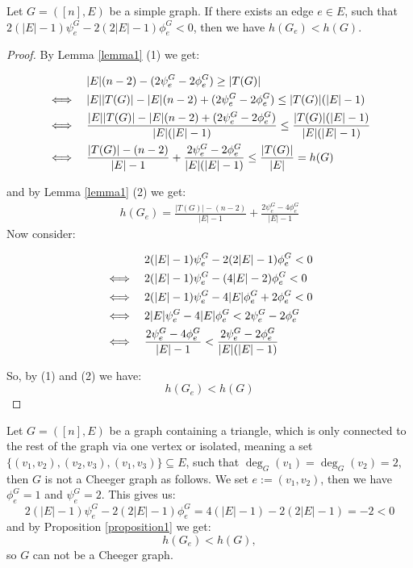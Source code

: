 \begin{prop}\label{proposition1}
Let \(G=([n],E)\) be a simple graph. If there exists an edge \(e\in E\), such that \(2(|E|-1)\psi_e^G-2(2|E|-1)\phi_e^G<0\), then we have \(h(G_e)<h(G)\).
\begin{proof}
By Lemma \ref{lemma1} (1) we get:
\begin{doublespace}
\begin{align}
&\quad\quad\quad\:\, |E|(n-2)-(2\psi_e^G-2\phi_e^G)\geq |T(G)|\notag\\
&\Longleftrightarrow\quad |E||T(G)|-|E|(n-2)+(2\psi_e^G-2\phi_e^G)\leq |T(G)|(|E|-1)\notag\\
&\Longleftrightarrow\quad \frac{|E||T(G)|-|E|(n-2)+(2\psi_e^G-2\phi_e^G)}{|E|(|E|-1)}\leq\frac{|T(G)|(|E|-1)}{|E|(|E|-1)}\notag\\
&\Longleftrightarrow\quad \frac{|T(G)|-(n-2)}{|E|-1}+\frac{2\psi_e^G-2\phi_e^G}{|E|(|E|-1)}\leq\frac{|T(G)|}{|E|}=h(G)
\end{align}
\end{doublespace}
and by Lemma \ref{lemma1} (2) we get:
\begin{align}
h(G_e)=\frac{|T(G)|-(n-2)}{|E|-1}+\frac{2\psi_e^G-4\phi_e^G}{|E|-1}
\end{align}
Now consider:
\begin{doublespace}
\begin{align}
&\quad\quad\quad\:\, 2(|E|-1)\psi_e^G-2(2|E|-1)\phi_e^G<0\notag\\
&\Longleftrightarrow\quad 2(|E|-1)\psi_e^G-(4|E|-2)\phi_e^G<0\notag\\
&\Longleftrightarrow\quad 2(|E|-1)\psi_e^G-4|E|\phi_e^G+2\phi_e^G<0\notag\\
&\Longleftrightarrow\quad 2|E|\psi_e^G-4|E|\phi_e^G<2\psi_e^G-2\phi_e^G\notag\\
&\Longleftrightarrow\quad \frac{2\psi_e^G-4\phi_e^G}{|E|-1}<\frac{2\psi_e^G-2\phi_e^G}{|E|(|E|-1)}\notag
\end{align}
\end{doublespace}
So, by (1) and (2) we have:
\[
h(G_e)<h(G)
\]
\end{proof}
\end{prop}
\begin{expl}
Let \(G=([n],E)\) be a graph containing a triangle, which is only connected to the rest of the graph via one vertex or isolated, meaning a set \(\{(v_1,v_2),(v_2,v_3),(v_1,v_3)\}\subseteq E\), such that \(\deg_G(v_1)=\deg_G(v_2)=2\), then \(G\) is not a Cheeger graph as follows. We set \(e:=(v_1,v_2)\), then we have \(\phi_e^G=1\) and \(\psi_e^G=2\). This gives us:
\[
2(|E|-1)\psi_e^G-2(2|E|-1)\phi_e^G=4(|E|-1)-2(2|E|-1)=-2<0
\]
and by Proposition \ref{proposition1} we get:
\[
h(G_e)<h(G),
\]
so \(G\) can not be a Cheeger graph.
\end{expl}
